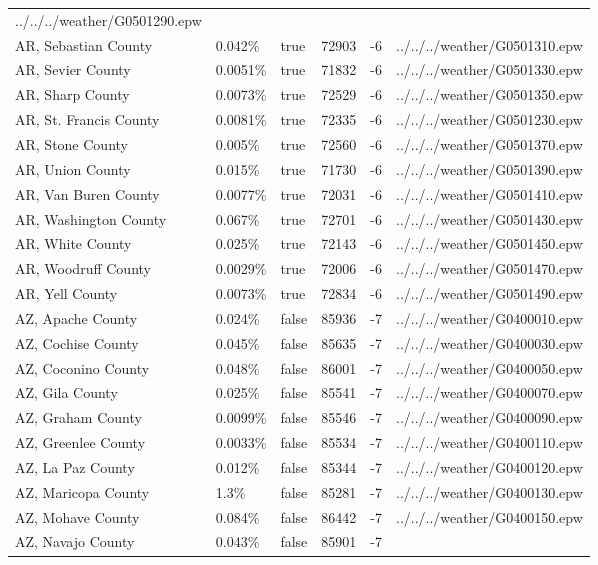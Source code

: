 \begin{longtable}[]{@{}llllll@{}}
../../../weather/G0501290.epw \\
AR, Sebastian County & 0.042\% & true & 72903 & -6 &
../../../weather/G0501310.epw \\
AR, Sevier County & 0.0051\% & true & 71832 & -6 &
../../../weather/G0501330.epw \\
AR, Sharp County & 0.0073\% & true & 72529 & -6 &
../../../weather/G0501350.epw \\
AR, St. Francis County & 0.0081\% & true & 72335 & -6 &
../../../weather/G0501230.epw \\
AR, Stone County & 0.005\% & true & 72560 & -6 &
../../../weather/G0501370.epw \\
AR, Union County & 0.015\% & true & 71730 & -6 &
../../../weather/G0501390.epw \\
AR, Van Buren County & 0.0077\% & true & 72031 & -6 &
../../../weather/G0501410.epw \\
AR, Washington County & 0.067\% & true & 72701 & -6 &
../../../weather/G0501430.epw \\
AR, White County & 0.025\% & true & 72143 & -6 &
../../../weather/G0501450.epw \\
AR, Woodruff County & 0.0029\% & true & 72006 & -6 &
../../../weather/G0501470.epw \\
AR, Yell County & 0.0073\% & true & 72834 & -6 &
../../../weather/G0501490.epw \\
AZ, Apache County & 0.024\% & false & 85936 & -7 &
../../../weather/G0400010.epw \\
AZ, Cochise County & 0.045\% & false & 85635 & -7 &
../../../weather/G0400030.epw \\
AZ, Coconino County & 0.048\% & false & 86001 & -7 &
../../../weather/G0400050.epw \\
AZ, Gila County & 0.025\% & false & 85541 & -7 &
../../../weather/G0400070.epw \\
AZ, Graham County & 0.0099\% & false & 85546 & -7 &
../../../weather/G0400090.epw \\
AZ, Greenlee County & 0.0033\% & false & 85534 & -7 &
../../../weather/G0400110.epw \\
AZ, La Paz County & 0.012\% & false & 85344 & -7 &
../../../weather/G0400120.epw \\
AZ, Maricopa County & 1.3\% & false & 85281 & -7 &
../../../weather/G0400130.epw \\
AZ, Mohave County & 0.084\% & false & 86442 & -7 &
../../../weather/G0400150.epw \\
AZ, Navajo County & 0.043\% & false & 85901 & -7 &

\end{longtable}
